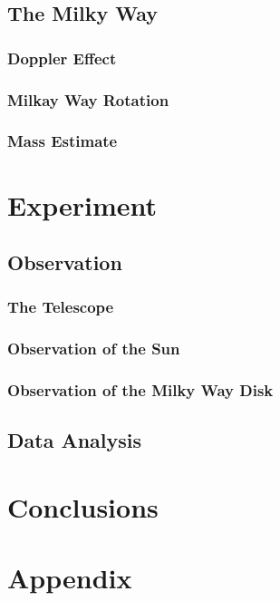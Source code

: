 \documentclass[12pt,a4paper]{article}
\begin{document}
  \subsection{The Milky Way}
    \subsubsection{Doppler Effect}
    \subsubsection{Milkay Way Rotation}
    \subsubsection{Mass Estimate}

\section{Experiment}
    \subsection{Observation}
        \subsubsection{The Telescope}
        \subsubsection{Observation of the Sun}
        \subsubsection{Observation of the Milky Way Disk}

    \subsection{Data Analysis}

\section{Conclusions}

\printbibliography     
\appendix
\section{Appendix}
\end{document}
